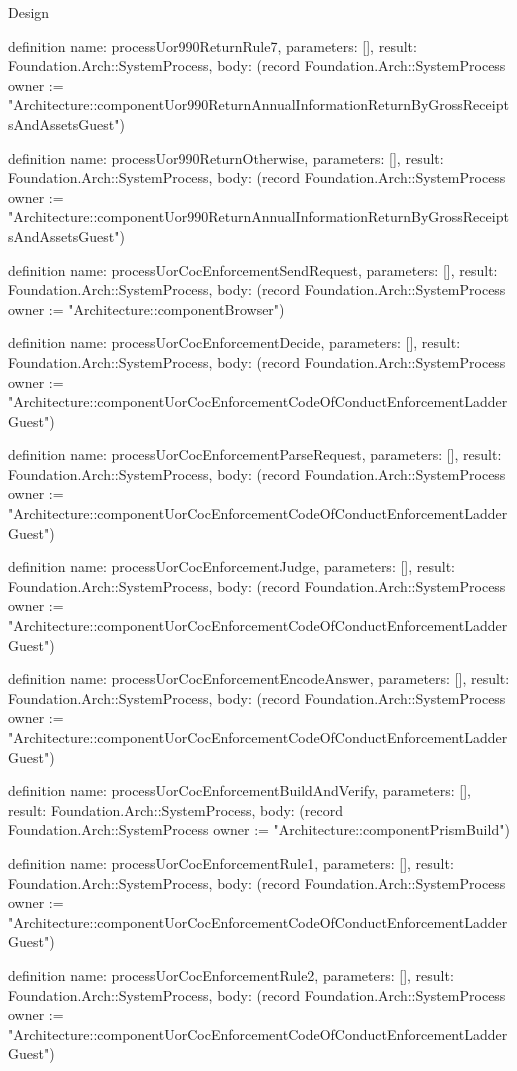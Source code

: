 \begin{lexlean}{Design}
\begin{semanticmodule}
definition{
  name: processUor990ReturnRule7,
  parameters: [],
  result: Foundation.Arch::SystemProcess,
  body: (record Foundation.Arch::SystemProcess {owner := "Architecture::componentUor990ReturnAnnualInformationReturnByGrossReceiptsAndAssetsGuest"})
}

definition{
  name: processUor990ReturnOtherwise,
  parameters: [],
  result: Foundation.Arch::SystemProcess,
  body: (record Foundation.Arch::SystemProcess {owner := "Architecture::componentUor990ReturnAnnualInformationReturnByGrossReceiptsAndAssetsGuest"})
}

definition{
  name: processUorCocEnforcementSendRequest,
  parameters: [],
  result: Foundation.Arch::SystemProcess,
  body: (record Foundation.Arch::SystemProcess {owner := "Architecture::componentBrowser"})
}

definition{
  name: processUorCocEnforcementDecide,
  parameters: [],
  result: Foundation.Arch::SystemProcess,
  body: (record Foundation.Arch::SystemProcess {owner := "Architecture::componentUorCocEnforcementCodeOfConductEnforcementLadderGuest"})
}

definition{
  name: processUorCocEnforcementParseRequest,
  parameters: [],
  result: Foundation.Arch::SystemProcess,
  body: (record Foundation.Arch::SystemProcess {owner := "Architecture::componentUorCocEnforcementCodeOfConductEnforcementLadderGuest"})
}

definition{
  name: processUorCocEnforcementJudge,
  parameters: [],
  result: Foundation.Arch::SystemProcess,
  body: (record Foundation.Arch::SystemProcess {owner := "Architecture::componentUorCocEnforcementCodeOfConductEnforcementLadderGuest"})
}

definition{
  name: processUorCocEnforcementEncodeAnswer,
  parameters: [],
  result: Foundation.Arch::SystemProcess,
  body: (record Foundation.Arch::SystemProcess {owner := "Architecture::componentUorCocEnforcementCodeOfConductEnforcementLadderGuest"})
}

definition{
  name: processUorCocEnforcementBuildAndVerify,
  parameters: [],
  result: Foundation.Arch::SystemProcess,
  body: (record Foundation.Arch::SystemProcess {owner := "Architecture::componentPrismBuild"})
}

definition{
  name: processUorCocEnforcementRule1,
  parameters: [],
  result: Foundation.Arch::SystemProcess,
  body: (record Foundation.Arch::SystemProcess {owner := "Architecture::componentUorCocEnforcementCodeOfConductEnforcementLadderGuest"})
}

definition{
  name: processUorCocEnforcementRule2,
  parameters: [],
  result: Foundation.Arch::SystemProcess,
  body: (record Foundation.Arch::SystemProcess {owner := "Architecture::componentUorCocEnforcementCodeOfConductEnforcementLadderGuest"})
}


\end{semanticmodule}
\end{lexlean}
